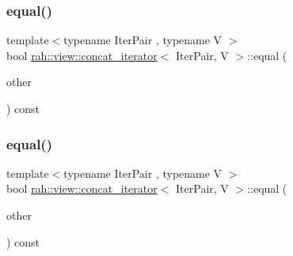 \mbox{\label{structrah_1_1view_1_1concat__iterator_a6e8021ecde205f2ceba2c167a6954d05}} 
\subsubsection{\texorpdfstring{equal()}{equal()}\hspace{0.1cm}{\footnotesize\ttfamily [1/2]}}
{\footnotesize\ttfamily template$<$typename Iter\+Pair , typename V $>$ \\
bool \mbox{\hyperlink{structrah_1_1view_1_1concat__iterator}{rah\+::view\+::concat\+\_\+iterator}}$<$ Iter\+Pair, V $>$\+::equal (\begin{DoxyParamCaption}\item[{\mbox{\hyperlink{structrah_1_1view_1_1concat__iterator}{concat\+\_\+iterator}}$<$ Iter\+Pair, V $>$}]{other }\end{DoxyParamCaption}) const\hspace{0.3cm}{\ttfamily [inline]}}

\mbox{\label{structrah_1_1view_1_1concat__iterator_a6e8021ecde205f2ceba2c167a6954d05}} 
\subsubsection{\texorpdfstring{equal()}{equal()}\hspace{0.1cm}{\footnotesize\ttfamily [2/2]}}
{\footnotesize\ttfamily template$<$typename Iter\+Pair , typename V $>$ \\
bool \mbox{\hyperlink{structrah_1_1view_1_1concat__iterator}{rah\+::view\+::concat\+\_\+iterator}}$<$ Iter\+Pair, V $>$\+::equal (\begin{DoxyParamCaption}\item[{\mbox{\hyperlink{structrah_1_1view_1_1concat__iterator}{concat\+\_\+iterator}}$<$ Iter\+Pair, V $>$}]{other }\end{DoxyParamCaption}) const\hspace{0.3cm}{\ttfamily [inline]}}

